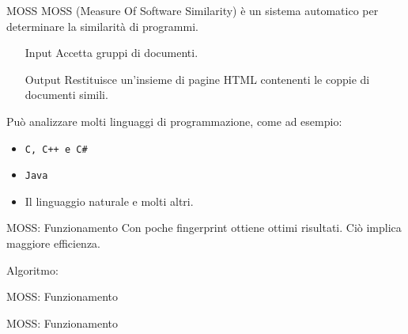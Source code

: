 \documentclass{beamer}
\begin{document}
	\begin{frame}{MOSS}
		MOSS (Measure Of Software Similarity) è un sistema automatico per determinare la similarità di programmi.
		
		\begin{itemize}
			\item[Input] Accetta gruppi di documenti.
			\item[Output] Restituisce un'insieme di pagine HTML contenenti le coppie di documenti simili.
		\end{itemize}
		
		\pause
		Può analizzare molti linguaggi di programmazione, come ad esempio:
		\begin{itemize}
			\item \texttt{C, C++ e C\#}
			\item \texttt{Java}
			\item Il linguaggio naturale e molti altri.
		\end{itemize}
	\end{frame}

	\begin{frame}{MOSS: Funzionamento}
		Con poche fingerprint ottiene ottimi risultati. Ciò implica maggiore efficienza.
		
		Algoritmo:
			
	\end{frame}

	\begin{frame}{MOSS: Funzionamento}
		\vspace{-0.8cm}\begin{center}
		\end{center}
	\end{frame}
	
	\begin{frame}{MOSS: Funzionamento}
		\vspace{-0.5cm}\begin{center}
		\end{center}
	\end{frame}
	
\end{document}
